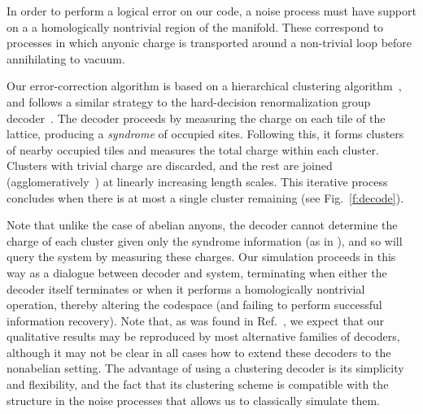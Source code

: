 \documentclass[aps, prl, letterpaper, twocolumn, superscriptaddress, notitlepage, 10pt]{revtex4-1}
\newcommand{\Fref}[1]{Fig.~\ref{#1}}
\begin{document}
In order to perform a logical error on our code, a noise process must have support on a 
a homologically nontrivial region of the manifold.
These correspond to processes in which anyonic charge is transported around a non-trivial loop before 
annihilating to vacuum.

Our error-correction algorithm is
based on a hierarchical clustering algorithm~\cite{Hastie2009, Wootton2015b},
and follows a similar strategy to the hard-decision renormalization group decoder~\cite{Bravyi2011}. 
The decoder proceeds by measuring the charge on 
each tile of the lattice, producing a \emph{syndrome} 
of occupied sites. Following this, it forms clusters of nearby occupied tiles and 
measures the total charge within each cluster.
Clusters with trivial charge are discarded, and
the rest are joined (agglomeratively~\cite{Hastie2009})
at linearly increasing length scales. This iterative process concludes when 
there is at most a single cluster remaining (see \Fref{f:decode}).

Note that unlike the case of abelian anyons, the decoder
cannot determine the charge of each cluster given only the syndrome information (as in \cite{Bravyi2011}),
and so will query the system by measuring these charges.
Our simulation proceeds in this way as a dialogue between decoder
and system, terminating when either the decoder itself terminates or 
when it performs a homologically nontrivial operation, thereby altering the 
codespace (and failing to perform successful information recovery).
Note that, as was found in Ref.~\cite{Brell2013}, we expect that 
our qualitative results may be reproduced by most alternative families 
of decoders, although it may not be clear in all cases how to extend these decoders to the nonabelian setting.
The advantage of using a clustering decoder is 
its simplicity and flexibility, and the fact that its clustering 
scheme is compatible with the structure in the noise 
processes that allows us to classically simulate them.
\end{document}
